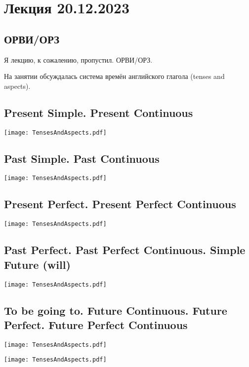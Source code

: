 \documentclass[main.tex]{subfiles}
\begin{document}
\section{Лекция 20.12.2023}

\subsection{ОРВИ/ОРЗ}

Я лекцию, к сожалению, пропустил. ОРВИ/ОРЗ.

На занятии обсуждалась система времён английского глагола (tenses and aspects).

\subsection{Present Simple. Present Continuous}
\vspace{-10mm}
{\parindent-20pt\texttt{[image: TensesAndAspects.pdf]}}\newpage

\subsection{Past Simple. Past Continuous}
\vspace{-5mm}
{\parindent-20pt\texttt{[image: TensesAndAspects.pdf]}}\newpage

\subsection{Present Perfect. Present Perfect Continuous}
\vspace{-5mm}
{\parindent-20pt\texttt{[image: TensesAndAspects.pdf]}}\newpage

\subsection{Past Perfect. Past Perfect Continuous. Simple Future (will)}
\vspace{-5mm}
{\parindent-20pt\texttt{[image: TensesAndAspects.pdf]}}\newpage

\subsection{To be going to. Future Continuous. Future Perfect. Future Perfect Continuous}
\vspace{-5mm}
{\parindent-20pt\texttt{[image: TensesAndAspects.pdf]}}\newpage

{\parindent-20pt\texttt{[image: TensesAndAspects.pdf]}}
\end{document}
